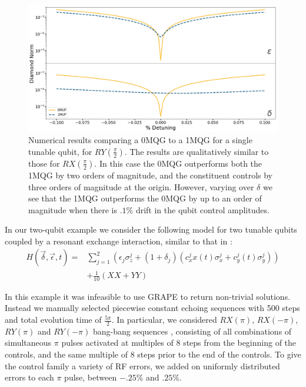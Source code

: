 \documentclass[aps,nofootinbib,pra,notitlepage,twocolumn]{revtex4-1}
\begin{document}
\begin{figure}
  \centering
  \includegraphics[width=\columnwidth]{SQRTY_no_member.png}
  \caption{Numerical results comparing a 0MQG to a 1MQG for a single tunable qubit, for $RY(\frac{\pi}{2})$. The results are qualitatively similar to those for $RX(\frac{\pi}{2})$. In this case the 0MQG outperforms both the 1MQG by two orders of magnitude, and the constituent controls by three orders of magnitude at the origin. However, varying over $\delta$ we see that the 1MQG outperforms the 0MQG by up to an order of magnitude when there is $.1\%$ drift in the qubit control amplitudes.}
  \label{fig:YMQG}
\end{figure}

In our two-qubit example we consider the following model for two tunable qubits coupled by a resonant exchange interaction, similar to that in \cite{McKay2016}:
\begin{equation} \label{eq:2Qham}
\begin{split}
H(\vec{\delta}, \vec{\epsilon}, t) = &\sum_{j=1}^2(\epsilon_j\sigma_z^j + (1 + \delta_j)(c_x^jx(t)\sigma_x^j + c_y^j(t)\sigma_y^j)) \\
&+ \frac{1}{10}(XX + YY)
\end{split}
\end{equation}

In this example it was infeasible to use GRAPE to return non-trivial solutions. Instead we manually selected piecewise constant echoing sequences with 500 steps and total evolution time of $\frac{5\pi}{2}$. In particular, we considered $RX(\pi)$, $RX(-\pi)$, $RY(\pi)$ and $RY(-\pi)$ bang-bang sequences \cite{bangbang}, consisting of all combinations of simultaneous $\pi$ pulses activated at multiples of $8$ steps from the beginning of the controls, and the same multiple of $8$ steps prior to the end of the controls. To give the control family a variety of RF errors, we added on uniformly distributed errors to each $\pi$ pulse, between $-.25$\% and $.25$\%.
\end{document}
